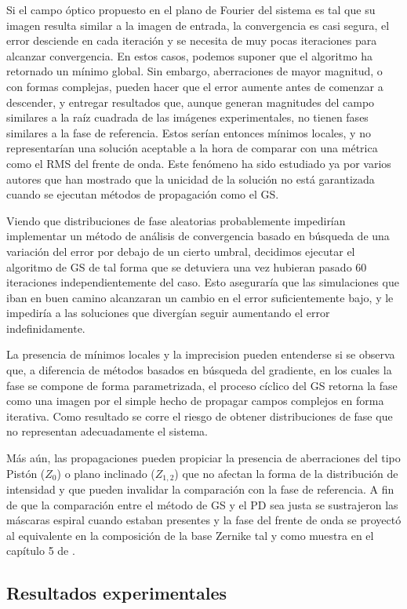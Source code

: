 Si el campo óptico propuesto en el plano de
Fourier del sistema es tal que su imagen resulta similar a la imagen
de entrada, la convergencia es casi segura, el error desciende en cada
iteración y se necesita de muy pocas
iteraciones para alcanzar convergencia. En estos casos, podemos
suponer que el algoritmo ha retornado un mínimo global. Sin embargo, aberraciones de
mayor magnitud, o con formas complejas, pueden hacer que el error
aumente antes de comenzar a descender, y entregar resultados que,
aunque generan magnitudes del campo similares a la raíz cuadrada de
las imágenes experimentales, no tienen fases similares a la fase de
referencia. Estos serían entonces mínimos locales, y no representarían
una solución aceptable a la hora de comparar con una métrica como el
RMS del frente de onda. Este fenómeno ha sido estudiado ya por varios
autores  que han mostrado que la
unicidad de la solución no está garantizada cuando se ejecutan métodos
de propagación como el GS.

Viendo que distribuciones de fase aleatorias probablemente impedirían
implementar un método de análisis de convergencia basado en búsqueda
de una variación del error por debajo de un cierto umbral, decidimos
ejecutar el algoritmo de GS de tal forma que se detuviera una vez
hubieran pasado 60 iteraciones independientemente del caso. Esto
aseguraría que las simulaciones que iban en buen camino alcanzaran un
cambio en el error suficientemente bajo, y le impediría a las
soluciones que divergían seguir aumentando el error indefinidamente. 

 La presencia de mínimos locales y la
imprecision pueden entenderse si se observa 
que, a diferencia de métodos basados en búsqueda del gradiente, en los
cuales la fase se compone de forma parametrizada, el proceso cíclico
del GS retorna la fase como una imagen por el simple hecho de propagar campos complejos
en forma iterativa. Como resultado se corre el riesgo de obtener distribuciones
de fase que no representan adecuadamente el sistema. 

Más aún, las propagaciones pueden propiciar la presencia de aberraciones del tipo Pistón ($Z_0$) o plano inclinado
($Z_{1,2}$) que no afectan la forma de la distribución de intensidad y que
pueden invalidar la comparación con la fase de referencia. A fin de que la comparación entre el
método de GS y el PD sea justa se sustrajeron las máscaras espiral
cuando estaban presentes y la fase del frente de onda se proyectó al
equivalente en la composición de la base Zernike tal y como muestra en
el capítulo 5 de .



\subsection{Resultados experimentales}



\newpage
\pagebreak[4]

